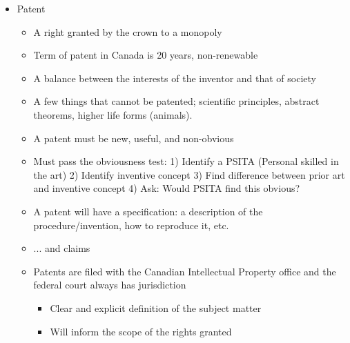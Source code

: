 \documentclass[10pt]{article}
\begin{document}
\begin{itemize}
\begin{itemize}
\end{itemize}
	\item Patent
\begin{itemize}
	\item A right granted by the crown to a monopoly
	\item Term of patent in Canada is 20 years, non-renewable
	\item A balance between the interests of the inventor and that of society
	\item A few things that cannot be patented; scientific principles, abstract theorems, higher life forms (animals). 
	\item A patent must be new, useful, and non-obvious
	\item Must pass the obviousness test: 1) Identify a PSITA (Personal skilled in the art) 2) Identify inventive concept 3) Find difference between prior art and inventive concept 4) Ask: Would PSITA find this obvious?
	\item A patent will have a specification: a description of the procedure/invention, how to reproduce it, etc.
	\item ... and claims
	\item Patents are filed with the Canadian Intellectual Property office and the federal court always has jurisdiction

\begin{itemize}
	\item Clear and explicit definition of the subject matter
	\item Will inform the scope of the rights granted
\end{itemize}


\end{itemize}
\end{itemize}
\end{document}
